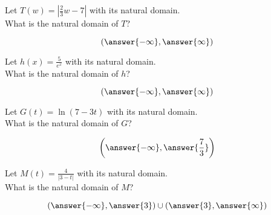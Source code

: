 \documentclass{ximera}
\author{Lee Wayand}
\begin{document}
\begin{exercise}








\begin{question}


Let $T(w) = | \tfrac{2}{3} w - 7 |$ with its natural domain. \\

What is the natural domain of $T$?

\[
\left( \answer{-\infty},  \answer{\infty}  \right)
\]


\end{question}







\begin{question}


Let $h(x) = \frac{5}{e^x}$ with its natural domain. \\

What is the natural domain of $h$?

\[
\left( \answer{-\infty},  \answer{\infty}  \right)
\]


\end{question}








\begin{question}


Let $G(t) = \ln(7 - 3t)$ with its natural domain. \\

What is the natural domain of $G$?

\[
\left(  \answer{-\infty}, \answer{\frac{7}{3}}  \right)
\]


\end{question}








\begin{question}


Let $M(t) = \frac{4}{| 3 - t |}$ with its natural domain. \\

What is the natural domain of $M$?

\[
\left( \answer{-\infty}, \answer{3} \right) \cup  \left( \answer{3} , \answer{\infty} \right) 
\]


\end{question}













\end{exercise}
\end{document}
